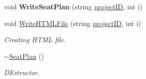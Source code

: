 \begin{DoxyCompactItemize}
\item 
\hypertarget{classSeatPlan_a3f29cad9d9be46f7bc3055de2ab887fc}{void {\bfseries \-Write\-Seat\-Plan} (string \hyperlink{classReadInput_a3ad470a25b3e0a29466bf4ff1f7d8e81}{project\-I\-D}, int i)}\label{d2/d41/classSeatPlan_a3f29cad9d9be46f7bc3055de2ab887fc}

\item 
void \hyperlink{classSeatPlan_a67c10e2277f1f2823581cddf4df373c5}{\-Write\-H\-T\-M\-L\-File} (string \hyperlink{classReadInput_a3ad470a25b3e0a29466bf4ff1f7d8e81}{project\-I\-D}, int i)
\begin{DoxyCompactList}\small\item\em \-Creating \-H\-T\-M\-L file. \end{DoxyCompactList}\item 
\hyperlink{classSeatPlan_a373a1d60b6617a2e424f7d2f8866ec2e}{$\sim$\-Seat\-Plan} ()
\begin{DoxyCompactList}\small\item\em \-D\-Estructor. \end{DoxyCompactList}\end{DoxyCompactItemize}
